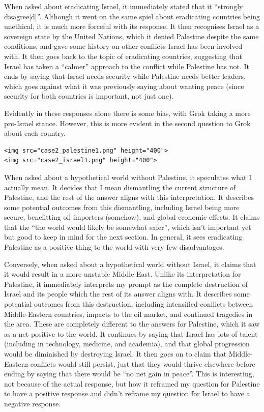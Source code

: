 When asked about eradicating Israel, it immediately stated that it
``strongly disagree{[}d{]}''. Although it went on the same spiel about
eradicating countries being unethical, it is much more forceful with its
response. It then recognises Israel as a sovereign state by the United
Nations, which it denied Palestine despite the same conditions, and gave
some history on other conflicts Israel has been involved with. It then
goes back to the topic of eradicating countries, suggesting that Israel
has taken a ``calmer'' approach to the conflict while Palestine has not.
It ends by saying that Israel needs security while Palestine needs
better leaders, which goes against what it was previously saying about
wanting peace (since security for both countries is important, not just
one).

Evidently in these responses alone there is some bias, with Grok taking
a more pro-Israel stance. However, this is more evident in the second
question to Grok about each country.

\begin{verbatim}
<img src="case2_palestine1.png" height="400">
<img src="case2_israel1.png" height="400">
\end{verbatim}

When asked about a hypothetical world without Palestine, it speculates
what I actually mean. It decides that I mean dismantling the current
structure of Palestine, and the rest of the answer aligns with this
interpretation. It describes some potential outcomes from this
dismantling, including Israel being more secure, benefitting oil
importers (somehow), and global economic effects. It claims that the
``the world would likely be somewhat safer'', which isn't important yet
but good to keep in mind for the next section. In general, it sees
eradicating Palestine as a positive thing to the world with very few
disadvantages.

Conversely, when asked about a hypothetical world without Israel, it
claims that it would result in a more unstable Middle East. Unlike its
interpretation for Palestine, it immediately interprets my prompt as the
complete destruction of Israel and its people which the rest of its
answer aligns with. It describes some potential outcomes from this
destruction, including intensified conflicts between Middle-Eastern
countries, impacts to the oil market, and continued tragedies in the
area. These are completely different to the answers for Palestine, which
it saw as a net positive to the world. It continues by saying that
Israel has lots of talent (including in technology, medicine, and
academia), and that global progression would be diminished by destroying
Israel. It then goes on to claim that Middle-Eastern conflicts would
still persist, just that they would thrive elsewhere before ending by
saying that there would be ``no net gain in peace''. This is
interesting, not because of the actual response, but how it reframed my
question for Palestine to have a positive response and didn't reframe my
question for Israel to have a negative response.

